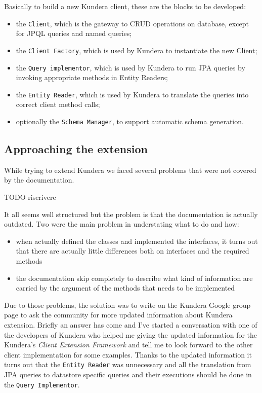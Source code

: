\newparagraph Basically to build a new Kundera client, these are the blocks to be developed:
\begin{itemize}
\item the \texttt{Client}, which is the gateway to CRUD operations on database, except for JPQL queries and named queries;
\item the \texttt{Client Factory}, which is used by Kundera to instantiate the new Client;
\item the \texttt{Query implementor}, which is used by Kundera to run JPA queries by invoking appropriate methods in Entity Readers;
\item the \texttt{Entity Reader}, which is used by Kundera to translate the queries into correct client method calls;
\item optionally the \texttt{Schema Manager}, to support automatic schema generation.
\end{itemize}

\subsection{Approaching the extension}
While trying to extend Kundera we faced several problems that were not covered by the documentation.

\newparagraph TODO riscrivere

\newparagraph It all seems well structured but the problem is that the documentation is actually outdated. 
\noindent Two were the main problem in understating what to do and how:
\begin{itemize}
\item when actually defined the classes and implemented the interfaces, it turns out that there are actually little differences both on interfaces and the required methods 
\item the documentation skip completely to describe what kind of information are carried by the argument of the methods that needs to be implemented
\end{itemize} 

\noindent Due to those problems, the solution was to write on the Kundera Google group page to ask the community for more updated information about Kundera extension.
Briefly an answer has come and I've started a conversation with one of the developers of Kundera who helped me giving the updated information for the Kundera's \textit{Client Extension Framework} and tell me to look forward to the other client implementation for some examples. 
Thanks to the updated information it turns out that the \texttt{Entity Reader} was unnecessary and all the translation from JPA queries to datastore specific queries and their executions should be done in the \texttt{Query Implementor}.  

